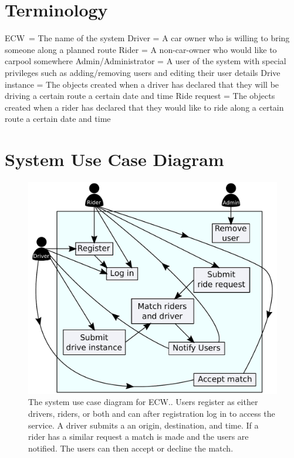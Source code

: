\documentclass{article}
\newcommand{\name}{ECW\ }
\newcommand{\namep}{ECW.}
\begin{document}
\section{Terminology}
\name = The name of the system\newline
Driver = A car owner who is willing to bring someone along a planned route\newline
Rider = A non-car-owner who would like to carpool somewhere\newline
Admin/Administrator = A user of the system with special privileges such as adding/removing users and editing their user details
Drive instance = The objects created when a driver has declared that they will be driving a certain route a certain date and time
Ride request = The objects created when a rider has declared that they would like to ride along a certain route a certain date and time

\newpage
\section{System Use Case Diagram}
\begin{figure}[!htpb]
    \centering
    \includegraphics[scale=0.75]{prdFigures/system_case_diagram.pdf}
    \caption{The system use case diagram for \namep. Users register as either drivers, riders, or both and can after registration log in to access the service. A driver submits a an origin, destination, and time. If a rider has a similar request a match is made and the users are notified. The users can then accept or decline the match.}
    \label{fig:useCaseDiagram}
\end{figure}
\end{document}
